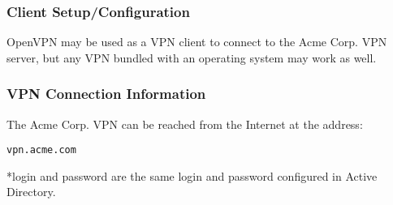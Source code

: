 \subsubsection{Client Setup/Configuration}
OpenVPN may be used as a VPN client to connect to the Acme Corp. VPN server, 
but any VPN bundled with an operating system may work as well. \\

\subsubsection{VPN Connection Information}
The Acme Corp. VPN can be reached from the Internet at the address:

\begin{lstlisting}[backgroundcolor=\color{Gray}]
 vpn.acme.com
\end{lstlisting}
*login and password are the same login and password configured in Active
Directory.
